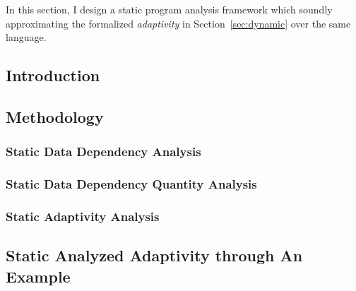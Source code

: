 In this section, I design a static program analysis framework which soundly approximating the formalized 
\emph{adaptivity} in Section~\ref{sec:dynamic} 
over the same language.
\subsection{Introduction}
\label{subsec:static-intro}


\subsection{Methodology}
\label{subsec:static-methodology}



\subsubsection{Static Data Dependency Analysis}
\label{subsubsec:static-datadep}


\subsubsection{Static Data Dependency Quantity Analysis}
\label{subsubsec:static-reachability}


\subsubsection{Static Adaptivity Analysis}
\label{subsubsec:static-adapt}


\subsection{Static Analyzed Adaptivity through An Example}
\label{subsec:static-examples}
% 

%
